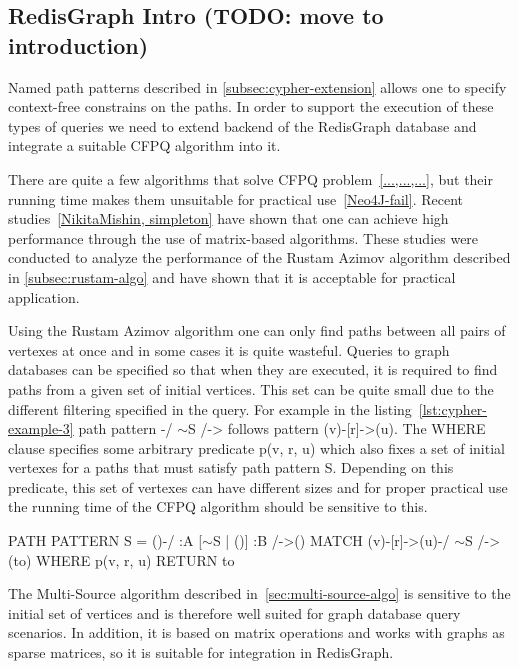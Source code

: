 \subsection{RedisGraph Intro (TODO: move to introduction)}

Named path patterns described in \autoref{subsec:cypher-extension} allows one to specify context-free constrains on the paths. In order to support the execution of these types of queries we need to extend backend of the RedisGraph database and integrate a suitable CFPQ algorithm into it. 

There are quite a few algorithms that solve CFPQ problem~\ref{...,...,...}, but their running time makes them unsuitable for practical use~\ref{Neo4J-fail}. Recent studies~\ref{NikitaMishin, simpleton} have shown that one can achieve high performance through the use of matrix-based algorithms. These studies were conducted to analyze the performance of the Rustam Azimov algorithm described in \autoref{subsec:rustam-algo} and have shown that it is acceptable for practical application.

Using the Rustam Azimov algorithm one can only find paths between all pairs of vertexes at once and in some cases it is quite wasteful. Queries to graph databases can be specified so that when they are executed, it is required to find paths from a given set of initial vertices. This set can be quite small due to the different filtering specified in the query. For example in the listing~\ref{lst:cypher-example-3} path pattern \colorbox{blue!10}{-/ $\sim$S /->} follows pattern \colorbox{blue!10}{(v)-[r]->(u)}. The WHERE clause specifies some arbitrary predicate \colorbox{blue!10}{p(v, r, u)} which also fixes a set of initial vertexes for a paths that must satisfy path pattern \colorbox{blue!10}{S}. Depending on this predicate, this set of vertexes can have different sizes and for proper practical use the running time of the CFPQ algorithm should be sensitive to this.

\begin{algorithm}
\begin{algorithmic}[1]
\caption{...}
\label{lst:cypher-example-3}
\State PATH PATTERN S = ()-/ :A [$\sim$S | ()] :B /->()
\State MATCH (v)-[r]->(u)-/ $\sim$S /->(to)
\State WHERE p(v, r, u)
\State RETURN to
\end{algorithmic}
\end{algorithm}

The Multi-Source algorithm described in~\autoref{sec:multi-source-algo} is sensitive to the initial set of vertices and is therefore well suited for graph database query scenarios. In addition, it is based on matrix operations and works with graphs as sparse matrices, so it is suitable for integration in RedisGraph.

